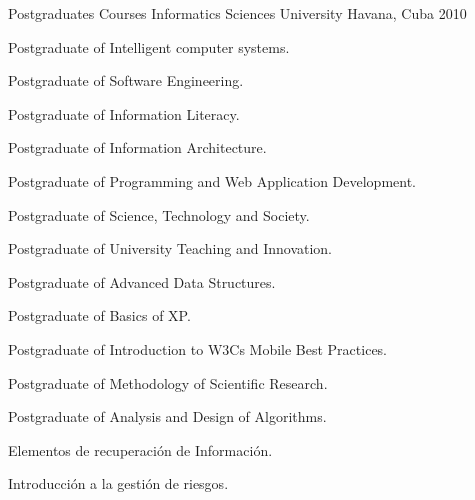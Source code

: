 


\begin{cventries}


\cventry
{Postgraduates Courses} %
{Informatics Sciences University} %
{Havana, Cuba} %
{2010} %
{ %
\begin{cvitems}
\item {Postgraduate of Intelligent computer systems.}
\item {Postgraduate of Software Engineering.}
\item {Postgraduate of Information Literacy.}
\item {Postgraduate of Information Architecture.}
\item {Postgraduate of Programming and Web Application Development.}
\item {Postgraduate of Science, Technology and Society.}
\item {Postgraduate of University Teaching and Innovation.}
\item {Postgraduate of Advanced Data Structures.}
\item {Postgraduate of Basics of XP.}
\item {Postgraduate of Introduction to W3Cs Mobile Best Practices.}
\item {Postgraduate of Methodology of Scientific Research.}
\item {Postgraduate of Analysis and Design of Algorithms.}
\item {Elementos de recuperación de Información.}
\item {Introducción a la gestión de riesgos.}
\end{cvitems}
}


\end{cventries}
